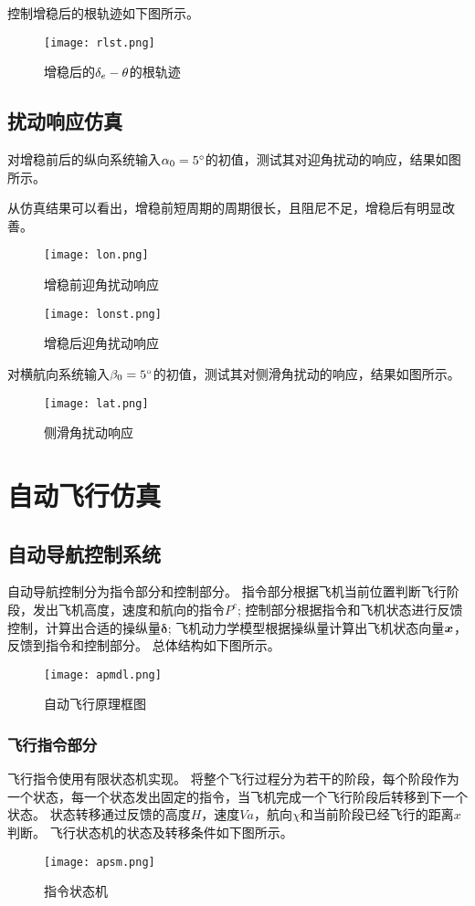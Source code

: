 控制增稳后的根轨迹如下图所示。
\begin{figure}[!h]
\centering\texttt{[image: rlst.png]}
\caption{增稳后的${\delta_e}-\theta$的根轨迹}
\label{rlst}
\end{figure}

\clearpage
\subsection{扰动响应仿真}
对增稳前后的纵向系统输入$\alpha_0=5\degree$的初值，测试其对迎角扰动的响应，结果如图所示。

从仿真结果可以看出，增稳前短周期的周期很长，且阻尼不足，增稳后有明显改善。
\begin{figure}[!h]
\centering\texttt{[image: lon.png]}
\caption{增稳前迎角扰动响应}
\label{course}
\end{figure}
\begin{figure}[!h]
\centering\texttt{[image: lonst.png]}
\caption{增稳后迎角扰动响应}
\label{course}
\end{figure}
\clearpage
对横航向系统输入$\beta_0=5\degree$的初值，测试其对侧滑角扰动的响应，结果如图所示。
\begin{figure}[!h]
\centering\texttt{[image: lat.png]}
\caption{侧滑角扰动响应}
\label{course}
\end{figure}
\clearpage
\section{自动飞行仿真}
\subsection{自动导航控制系统}
自动导航控制分为指令部分和控制部分。
指令部分根据飞机当前位置判断飞行阶段，发出飞机高度，速度和航向的指令$P^c$;
控制部分根据指令和飞机状态进行反馈控制，计算出合适的操纵量$\bm{\delta}$;
飞机动力学模型根据操纵量计算出飞机状态向量${\bm x}$，反馈到指令和控制部分。
总体结构如下图所示。
\begin{figure}[!h]
\centering\texttt{[image: apmdl.png]}
\caption{自动飞行原理框图}
\label{apmdl}
\end{figure}

\subsubsection{飞行指令部分}
飞行指令使用有限状态机实现。
将整个飞行过程分为若干的阶段，每个阶段作为一个状态，每一个状态发出固定的指令，当飞机完成一个飞行阶段后转移到下一个状态。
状态转移通过反馈的高度$H$，速度$Va$，航向$\chi$和当前阶段已经飞行的距离$x$判断。
飞行状态机的状态及转移条件如下图所示。
\begin{figure}[!h]
\centering\texttt{[image: apsm.png]}
\caption{指令状态机}
\label{apsm}
\end{figure}

